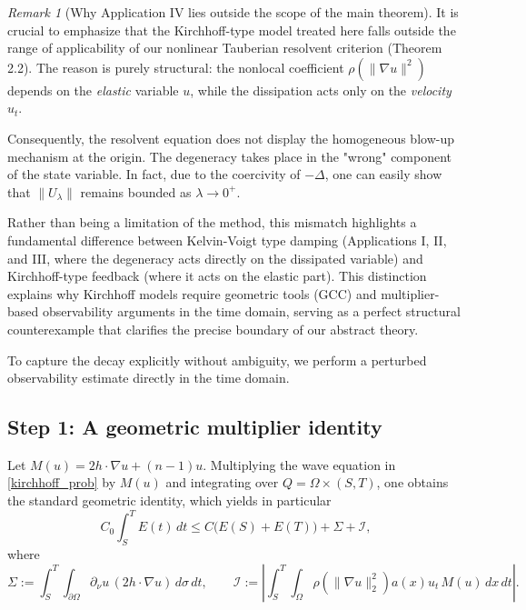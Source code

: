 \documentclass[11pt,reqno]{amsart}
\theoremstyle{remark}
\newtheorem{remark}[theorem]{Remark}
\begin{document}
\begin{remark}[Why Application IV lies outside the scope of the main theorem]
\label{rem:outside_scope}
It is crucial to emphasize that the Kirchhoff-type model treated here falls outside the range of applicability of our nonlinear Tauberian resolvent criterion (Theorem 2.2). The reason is purely structural: the nonlocal coefficient $\rho(\|\nabla u\|^2)$ depends on the \textit{elastic} variable $u$, while the dissipation acts only on the \textit{velocity} $u_t$.

Consequently, the resolvent equation does not display the homogeneous blow-up mechanism at the origin. The degeneracy takes place in the "wrong" component of the state variable. In fact, due to the coercivity of $-\Delta$, one can easily show that $\|U_\lambda\|$ remains bounded as $\lambda \to 0^+$.

Rather than being a limitation of the method, this mismatch highlights a fundamental difference between Kelvin-Voigt type damping (Applications I, II, and III, where the degeneracy acts directly on the dissipated variable) and Kirchhoff-type feedback (where it acts on the elastic part). This distinction explains why Kirchhoff models require geometric tools (GCC) and multiplier-based observability arguments in the time domain, serving as a perfect structural counterexample that clarifies the precise boundary of our abstract theory.
\end{remark}

To capture the decay explicitly without ambiguity, we perform a perturbed observability estimate directly in the time domain.

\subsection{Step 1: A geometric multiplier identity}

Let $M(u)=2h\cdot\nabla u+(n-1)u$. Multiplying the wave equation in \eqref{kirchhoff_prob} by $M(u)$ and integrating over $Q=\Omega\times(S,T)$, one obtains the standard geometric identity, which yields in particular
\begin{equation}\label{eq:energy_recovery}
C_0\int_S^T E(t)\,dt
\le C\bigl(E(S)+E(T)\bigr)+\Sigma+\mathcal I,
\end{equation}
where
\[
\Sigma:=\int_S^T\int_{\partial\Omega}\partial_\nu u\, (2h\cdot\nabla u)\,d\sigma\,dt,
\qquad
\mathcal I:=\left|\int_S^T\int_\Omega \rho(\|\nabla u\|_2^2)a(x)u_t\,M(u)\,dx\,dt\right|.
\]
\end{document}
